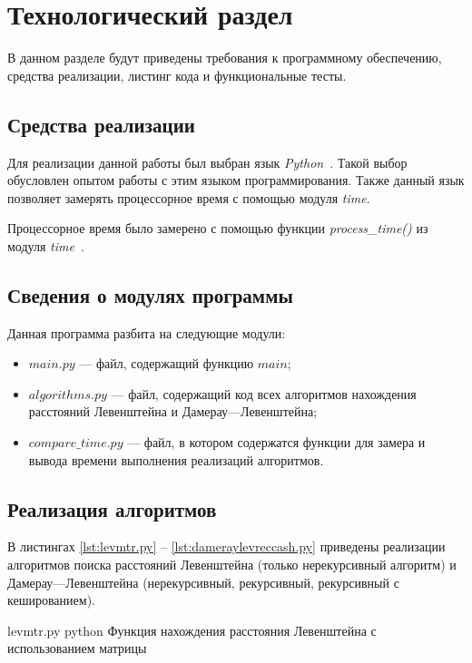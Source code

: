 \chapter{Технологический раздел}

В данном разделе будут приведены требования к программному обеспечению, средства реализации, листинг кода и функциональные тесты.

\section{Средства реализации}

Для реализации данной работы был выбран язык \textit{Python}~\cite{python}.
Такой выбор обусловлен опытом работы с этим языком программирования.
Также данный язык позволяет замерять процессорное время с помощью модуля \textit{time}.

Процессорное время было замерено с помощью функции \textit{process\_time()} из модуля \textit{time}~\cite{python-time}.

\section{Сведения о модулях программы}

Данная программа разбита на следующие модули:
\begin{itemize}
	\item $main.py$ --- файл, содержащий функцию $main$;
	\item $algorithms.py$ --- файл, содержащий код всех алгоритмов нахождения расстояний Левенштейна и Дамерау---Левенштейна;
	\item $compare\_time.py$ --- файл, в котором содержатся функции для замера и вывода времени выполнения реализаций алгоритмов.
\end{itemize}

\section{Реализация алгоритмов}

В листингах \ref{lst:levmtr.py} -- \ref{lst:dameraylevreccash.py} приведены реализации алгоритмов поиска расстояний Левенштейна (только нерекурсивный алгоритм) и Дамерау---Левенштейна (нерекурсивный, рекурсивный, рекурсивный с кешированием).

\clearpage

{levmtr.py} %
{python} %
{Функция нахождения расстояния Левенштейна с использованием матрицы} %

